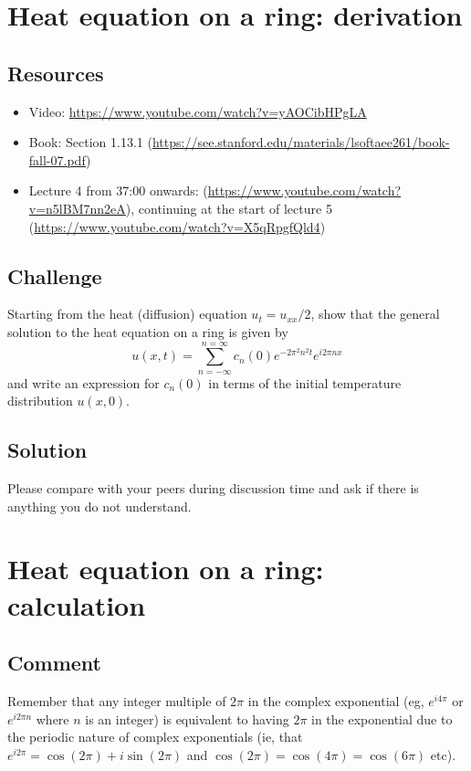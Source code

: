 \newpage
\section{Heat equation on a ring: derivation}
\label{sec:heateqnfc}

\subsection*{Resources}
\begin{itemize}
    \item Video: \url{https://www.youtube.com/watch?v=yAOCibHPgLA}
    \item Book: Section 1.13.1 (\url{https://see.stanford.edu/materials/lsoftaee261/book-fall-07.pdf})
    \item Lecture 4 from 37:00 onwards: (\url{https://www.youtube.com/watch?v=n5lBM7nn2eA}), continuing at the start of lecture 5 (\url{https://www.youtube.com/watch?v=X5qRpgfQld4})
\end{itemize}

\subsection*{Challenge}
Starting from the heat (diffusion) equation $u_t = u_{xx}/2$, show that the general solution to the heat equation on a ring is given by
\begin{equation}
    u(x,t) = \sum_{n=-\infty}^{n=\infty} c_n(0) e^{-2 \pi^2 n^2 t} e^{i 2 \pi n x}
\end{equation}
and write an expression for $c_n(0)$ in terms of the initial temperature distribution $u(x,0)$.

\subsection*{Solution}
Please compare with your peers during discussion time and ask if there is anything you do not understand.



\iffalse
\newpage
\section{Heat equation on a ring: calculation}
\label{sec:heateqn}

\subsection*{Comment}
Remember that any integer multiple of $2 \pi$ in the complex exponential (eg, $e^{i 4 \pi}$ or $e^{i 2 \pi n}$ where $n$ is an integer) is equivalent to having $2 \pi$ in the exponential due to the periodic nature of complex exponentials (ie, that $e^{i 2 \pi} = \cos(2 \pi) + i \sin(2 \pi)$ and $\cos(2 \pi) = \cos(4 \pi) = \cos(6 \pi)$ etc).

